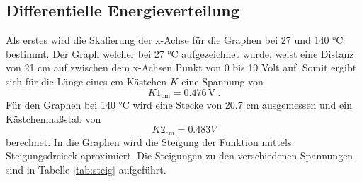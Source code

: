 \subsection{Differentielle Energieverteilung}
Als erstes wird die Skalierung der x-Achse für die Graphen bei 27 und 140 °C bestimmt. Der Graph welcher bei 27 °C aufgezeichnet wurde, weist eine Distanz von 21 cm auf zwischen dem x-Achsen Punkt von 0 bis 10 Volt auf. Somit ergibt sich für die Länge eines cm Kästchen $K$ eine Spannung von 
\begin{equation}
  K1_\text{cm} = 0.476 \, \text{V} \ . 
  \label{eqn:K1}
\end{equation}
Für den Graphen bei 140 °C wird eine Stecke von 20.7 cm ausgemessen und ein Kästchenmaßstab von 
\begin{equation}
  K2_\text{cm} = 0.483 V
  \label{eqn:K2}
\end{equation}
berechnet. 
In die Graphen wird die Steigung der Funktion mittels Steigungsdreieck aproximiert. Die Steigungen zu den verschiedenen Spannungen sind in Tabelle \ref{tab:steig} aufgeführt.
